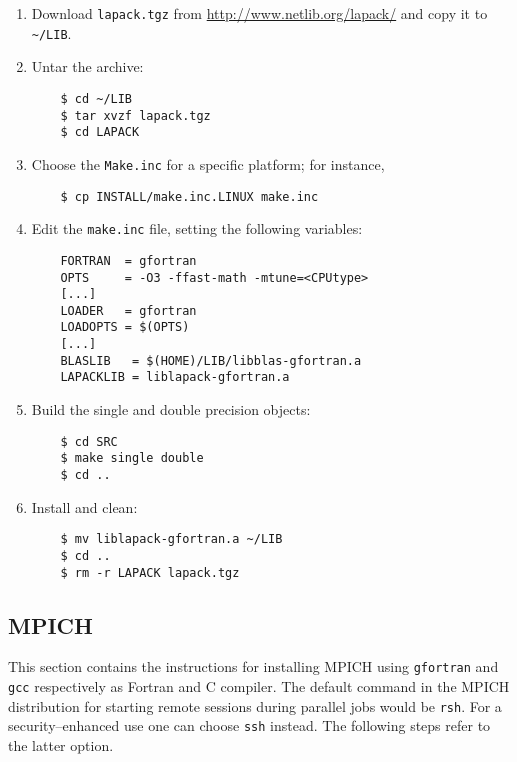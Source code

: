 \documentclass[a4paper,12pt]{article}%
\begin{document}
\begin{enumerate}
\item Download \verb+lapack.tgz+ from
  \url{http://www.netlib.org/lapack/} and copy it to \verb+~/LIB+.
\item Untar the archive:
  \begin{Verbatim}
    $ cd ~/LIB
    $ tar xvzf lapack.tgz
    $ cd LAPACK
  \end{Verbatim}
\item Choose the \verb+Make.inc+ for a specific platform; for instance,
  \begin{Verbatim}
    $ cp INSTALL/make.inc.LINUX make.inc
  \end{Verbatim}
\item Edit the \verb+make.inc+ file, setting the following variables:
  \begin{Verbatim}
    FORTRAN  = gfortran
    OPTS     = -O3 -ffast-math -mtune=<CPUtype>
    [...]
    LOADER   = gfortran
    LOADOPTS = $(OPTS)
    [...]
    BLASLIB   = $(HOME)/LIB/libblas-gfortran.a
    LAPACKLIB = liblapack-gfortran.a
  \end{Verbatim}
\item Build the single and double precision objects:
  \begin{Verbatim}
    $ cd SRC
    $ make single double
    $ cd ..
  \end{Verbatim}
\item Install and clean:
  \begin{Verbatim}
    $ mv liblapack-gfortran.a ~/LIB
    $ cd ..
    $ rm -r LAPACK lapack.tgz
  \end{Verbatim}
\end{enumerate}

\subsection{MPICH}

This section contains the instructions for installing MPICH using
\verb+gfortran+ and \verb+gcc+ respectively as Fortran and C
compiler. The default command in the MPICH distribution for starting
remote sessions during parallel jobs would be \verb+rsh+. For a 
security--enhanced use one can choose \verb+ssh+ instead. The
following steps refer to the latter option.
\end{document}
